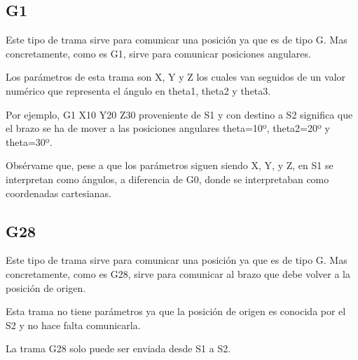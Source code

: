 \subsection{G1}
Este tipo de trama sirve para comunicar una posición ya que es de tipo G. Mas concretamente, como es G1, sirve para comunicar posiciones angulares.

Los parámetros de esta trama son X, Y y Z los cuales van seguidos de un valor numérico que representa el ángulo en theta1, theta2 y theta3.

Por ejemplo, G1 X10 Y20 Z30 proveniente de \ac{S1} y con destino a \ac{S2} significa que el brazo se ha de mover a las posiciones angulares theta=10º, theta2=20º y theta=30º.

Obsérvame que, pese a que los parámetros siguen siendo X, Y, y Z, en S1 se interpretan como ángulos, a diferencia de G0, donde se interpretaban como coordenadas cartesianas.

\subsection{G28}
Este tipo de trama sirve para comunicar una posición ya que es de tipo G. Mas concretamente, como es G28, sirve para comunicar al brazo que debe volver a la posición de origen.

Esta trama no tiene parámetros ya que la posición de origen es conocida por el \ac{S2} y no hace falta comunicarla.

La trama G28 solo puede ser enviada desde \ac{S1} a \ac{S2}.
